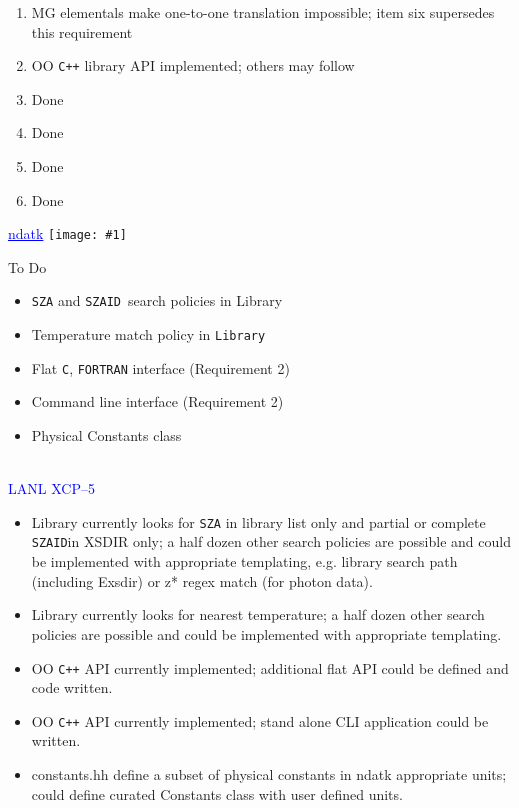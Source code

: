 \documentclass[clock]{slides}
\newenvironment{xslide}[1][logo.jpg]{\begin{slide} \tiny
\textcolor{blue}{\underline{ndatk}} \hfill
\texttt{[image: \#1]}
\normalsize}{\vfill\tiny
\textcolor{blue}{\hrulefill \\LANL XCP--5}
\end{slide}}
\newcommand{\zaid}{\texttt{SZAID}}
\begin{document}
\begin{note}\small
\begin{enumerate}
\item MG elementals make one-to-one translation impossible; item six
  supersedes this requirement
\item OO \texttt{C++} library API implemented; others may follow
\item Done
\item Done
\item Done
\item Done
\end{enumerate}
\end{note}

\begin{xslide}
\begin{center}\Large
To Do
\end{center}

\begin{itemize}
\item \texttt{SZA} and \zaid\ search policies in Library
\item Temperature match policy in \texttt{Library}
\item Flat \texttt{C}, \texttt{FORTRAN} interface (Requirement 2)
\item Command line interface (Requirement 2)
\item Physical Constants class
\end{itemize}
\end{xslide}

\begin{note}\small
\begin{itemize}
\item Library currently looks for \texttt{SZA} in library list only
  and partial or complete \zaid in XSDIR only; a half dozen other
  search policies are possible and could be implemented with
  appropriate templating, e.g. library search path (including Exsdir)
  or z* regex match (for photon data).
\item Library currently looks for nearest temperature; a half dozen
  other search policies are possible and could be implemented with
  appropriate templating.
\item OO \texttt{C++} API currently implemented; additional flat API
  could be defined and code written.
\item OO \texttt{C++} API currently implemented; stand alone CLI
  application could be written.
\item constants.hh define a subset of physical constants in ndatk
  appropriate units; could define curated Constants class with user
  defined units.
\end{itemize}
\end{note}
\end{document}
